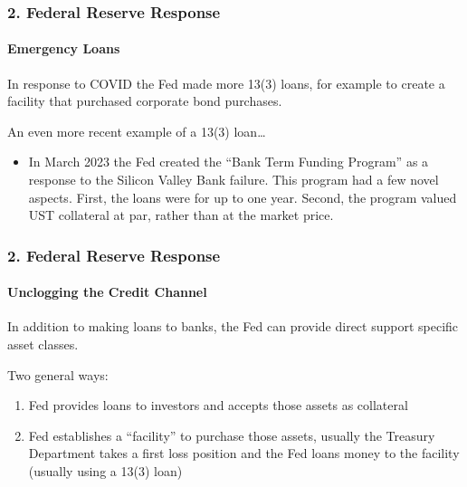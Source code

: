 \documentclass{beamer}
\begin{document}
\begin{frame}[t]
    \frametitle{2. Federal Reserve Response}
    \framesubtitle{Emergency Loans}

    In response to COVID the Fed made more 13(3) loans, for example to create a facility that purchased corporate bond purchases.
    \vspace{1em}
    
    An even more recent example of a 13(3) loan…
    \vspace{1em}
    
    \begin{itemize}
        \item In March 2023 the Fed created the “Bank Term Funding Program” as a response to the Silicon Valley Bank failure.   This program had a few novel aspects.   First, the loans were for up to one year.   Second, the program valued UST collateral at par, rather than at the market price.
    \end{itemize}
    
\end{frame}

\begin{frame}[t]
    \frametitle{2. Federal Reserve Response}
    \framesubtitle{Unclogging the Credit Channel}

    In addition to making loans to banks, the Fed can provide direct support specific asset classes.
    \vspace{1em}

    Two general ways:
    \begin{enumerate}
        \item Fed provides loans to investors and accepts those assets as collateral
        \item Fed establishes a “facility” to purchase those assets, usually the Treasury Department takes a first loss position and the Fed loans money to the facility (usually using a 13(3) loan)
    \end{enumerate}

\end{frame}
\end{document}
